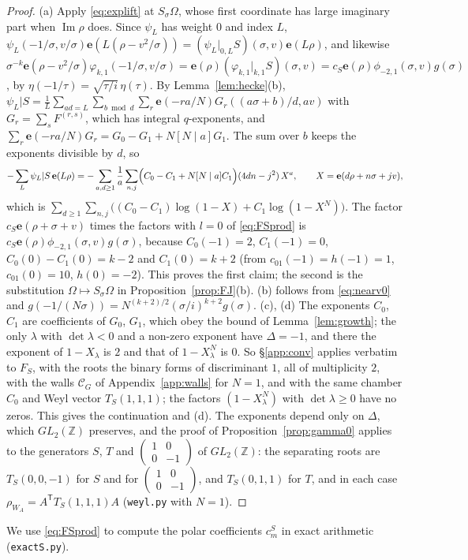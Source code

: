 \documentclass[11pt]{amsart}
\numberwithin{equation}{section}
\theoremstyle{plain}
\theoremstyle{definition}
\theoremstyle{remark}
\newcommand{\Z}{\mathbb{Z}}
\newcommand{\e}{\mathbf{e}}
\newcommand{\pmi}{\phi_{-2,1}}
\newcommand{\sm}[4]{\left(\begin{smallmatrix}#1&#2\\#3&#4\end{smallmatrix}\right)}
\begin{document}
\begin{proof}
(a) Apply \eqref{eq:explift} at $S_\sigma\Omega$, whose first coordinate has large imaginary part when $\operatorname{Im}\rho$ does. Since $\psi_L$ has weight $0$ and index $L$, $\psi_L(-1/\sigma,v/\sigma)\e(L(\rho-v^2/\sigma))=(\psi_L|_{0,L}S)(\sigma,v)\e(L\rho)$, and likewise $\sigma^{-k}\e(\rho-v^2/\sigma)\varphi_{k,1}(-1/\sigma,v/\sigma)=\e(\rho)(\varphi_{k,1}|_{k,1}S)(\sigma,v)=c_S\e(\rho)\pmi(\sigma,v)g(\sigma)$, by $\eta(-1/\tau)=\sqrt{\tau/i}\,\eta(\tau)$. By Lemma~\ref{lem:hecke}(b), $\psi_L|S=\frac1L\sum_{ad=L}\sum_{b\bmod d}\sum_r\e(-ra/N)G_r((a\sigma+b)/d,av)$ with $G_r=\sum_sF^{(r,s)}$, which has integral $q$-exponents, and $\sum_r\e(-ra/N)G_r=G_0-G_1+N[N\mid a]G_1$. The sum over $b$ keeps the exponents divisible by $d$, so
\[
-\sum_L\psi_L|S\,\e(L\rho)=-\sum_{a,d\ge1}\frac1a\sum_{n,j}\Bigl(C_0-C_1+N[N\mid a]C_1\Bigr)(4dn-j^2)\,X^a,\qquad X=\e(d\rho+n\sigma+jv),
\]
which is $\sum_{d\ge1}\sum_{n,j}\bigl((C_0-C_1)\log(1-X)+C_1\log(1-X^N)\bigr)$. The factor $c_S\e(\rho+\sigma+v)$ times the factors with $l=0$ of \eqref{eq:FSprod} is $c_S\e(\rho)\pmi(\sigma,v)g(\sigma)$, because $C_0(-1)=2$, $C_1(-1)=0$, $C_0(0)-C_1(0)=k-2$ and $C_1(0)=k+2$ (from $c_{01}(-1)=h(-1)=1$, $c_{01}(0)=10$, $h(0)=-2$). This proves the first claim; the second is the substitution $\Omega\mapsto S_\sigma\Omega$ in Proposition~\ref{prop:FJ}(b).
(b) follows from \eqref{eq:nearv0} and $g(-1/(N\sigma))=N^{(k+2)/2}(\sigma/i)^{k+2}g(\sigma)$.
(c), (d) The exponents $C_0$, $C_1$ are coefficients of $G_0$, $G_1$, which obey the bound of Lemma~\ref{lem:growth}; the only $\lambda$ with $\det\lambda<0$ and a non-zero exponent have $\Delta=-1$, and there the exponent of $1-X_\lambda$ is $2$ and that of $1-X_\lambda^N$ is $0$. So \S\ref{app:conv} applies verbatim to $F_S$, with the roots the binary forms of discriminant $1$, all of multiplicity $2$, with the walls $\mathcal C_G$ of Appendix~\ref{app:walls} for $N=1$, and with the same chamber $C_0$ and Weyl vector $T_S(1,1,1)$; the factors $(1-X_\lambda^N)$ with $\det\lambda\ge0$ have no zeros. This gives the continuation and (d). The exponents depend only on $\Delta$, which $GL_2(\Z)$ preserves, and the proof of Proposition~\ref{prop:gamma0} applies to the generators $S$, $T$ and $\sm100{-1}$ of $GL_2(\Z)$: the separating roots are $T_S(0,0,-1)$ for $S$ and for $\sm100{-1}$, and $T_S(0,1,1)$ for $T$, and in each case $\rho_{W_A}=A^{\mathsf T}T_S(1,1,1)A$ (\texttt{weyl.py} with $N=1$).
\end{proof}

We use \eqref{eq:FSprod} to compute the polar coefficients $c^S_m$ in exact arithmetic (\texttt{exactS.py}).
\end{document}
